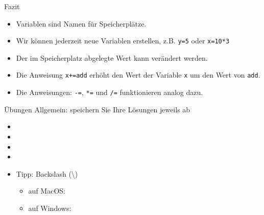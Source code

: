 \begin{frame}{Fazit}
    \begin{itemize}
        \item Variablen sind Namen für Speicherplätze.
        \item Wir können jederzeit neue Variablen erstellen, z.B. \lstinline|y=5| oder \lstinline|x=10*3|
        \item Der im Speicherplatz abgelegte Wert kann verändert werden.
        \item Die Anweisung \lstinline|x+=add| erhöht den Wert der Variable \lstinline|x| um den Wert von \lstinline|add|.
        \item Die Anweisungen: \lstinline|-=|, \lstinline|*=| und \lstinline|/=|  funktionieren analog dazu.
    \end{itemize}
\end{frame}

\begin{frame}{Übungen}
    Allgemein: speichern Sie Ihre Lösungen jeweils ab
    \begin{itemize}
        \item {}
        \item {}
        \item {}
        \item {}
        \item Tipp: Backslash (\textbackslash)
              \begin{itemize}
                  \item auf MacOS: 
                  \item auf Windows: \keys{\AltGr+<}
              \end{itemize}
    \end{itemize}
\end{frame}